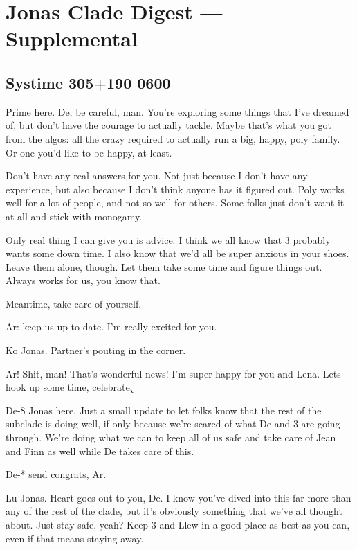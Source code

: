 \newpage
\hypertarget{jonas-clade-digest-supplemental}{%
\section*{Jonas Clade Digest --- Supplemental}\label{jonas-clade-digest-supplemental}}

\hypertarget{systime-305190-0600}{%
\subsection*{Systime 305+190 0600}\label{systime-305190-0600}}

Prime here. De, be careful, man. You're exploring some things that I've dreamed of, but don't have the courage to actually tackle. Maybe that's what you got from the algos: all the crazy required to actually run a big, happy, poly family. Or one you'd like to be happy, at least.

Don't have any real answers for you. Not just because I don't have any experience, but also because I don't think anyone has it figured out. Poly works well for a lot of people, and not so well for others. Some folks just don't want it at all and stick with monogamy.

Only real thing I can give you is advice. I think we all know that 3 probably wants some down time. I also know that we'd all be super anxious in your shoes. Leave them alone, though. Let them take some time and figure things out. Always works for us, you know that.

Meantime, take care of yourself.

Ar: keep us up to date. I'm really excited for you.

\secdiv{}

\noindent Ko Jonas. Partner's pouting in the corner.

Ar! Shit, man! That's wonderful news! I'm super happy for you and Lena. Lets hook up some time, celebrate.̨

\secdiv{}

\noindent De-8 Jonas here. Just a small update to let folks know that the rest of the subclade is doing well, if only because we're scared of what De and 3 are going through. We're doing what we can to keep all of us safe and take care of Jean and Finn as well while De takes care of this.

De-* send congrats, Ar.

\secdiv{}

\noindent Lu Jonas. Heart goes out to you, De. I know you've dived into this far more than any of the rest of the clade, but it's obviously something that we've all thought about. Just stay safe, yeah? Keep 3 and Llew in a good place as best as you can, even if that means staying away.

